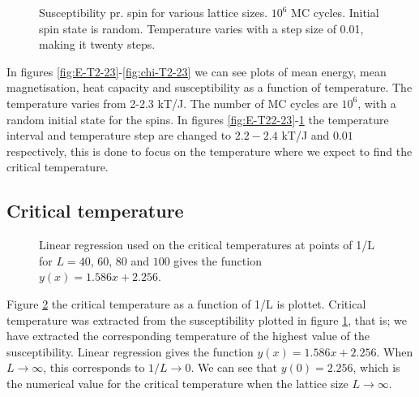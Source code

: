 \documentclass{emulateapj}
\begin{document}
%
\begin{figure}
\mbox{}
\caption{Susceptibility pr. spin for various lattice sizes. $10^6$ MC cycles. Initial spin state is random. Temperature varies with a step size of 0.01, making it twenty steps.}
\label{fig:chi-T22-23}
\end{figure}
%
In figures \ref{fig:E-T2-23}-\ref{fig:chi-T2-23} we can see plots of mean energy, mean magnetisation, heat capacity and susceptibility as a function of temperature. The temperature varies from 2-2.3 kT/J. The number of MC cycles are $10^6$, with a random initial state for the spins. In figures \ref{fig:E-T22-23}-\ref{fig:chi-T22-23} the temperature interval and temperature step are changed to $2.2-2.4$ kT/J and $0.01$ respectively, this is done to focus on the temperature where we expect to find the critical temperature. 


\subsection{Critical temperature}
\begin{figure}
\mbox{}
\caption{Linear regression used on the critical temperatures at points of 1/L for $L = 40$, $60$, $80$ and $100$ gives the function $y(x) = 1.586x + 2.256$.}
\label{fig:FittedTc}
\end{figure}
%
Figure \ref{fig:FittedTc} the critical temperature as a function of 1/L is plottet. Critical temperature was extracted from the susceptibility plotted in figure \ref{fig:chi-T22-23}, that is; we have extracted the corresponding temperature of the highest value of the susceptibility. Linear regression gives the function $y(x) = 1.586x + 2.256$. When $L \rightarrow \infty$, this corresponds to $1/L \rightarrow 0$. We can see that $y(0) = 2.256$, which is the numerical value for the critical temperature when the lattice size $L \rightarrow \infty$.
\end{document}
